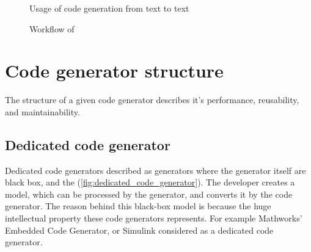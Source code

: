 \begin{figure}
	\centering
	\caption{Usage of code generation from text to text}
\label{fig:model_transformations}
\end{figure}

\begin{figure}
	\centering
	\caption{Workflow of}
\label{fig:model_transformation_cpp}
\end{figure}

\section{Code generator structure}

The structure of a given code generator describes it's performance, reusability, and maintainability.

\subsection{Dedicated code generator}
\label{subsec:dedicated_code_generator}

Dedicated code generators described as generators where the generator itself are black box, and the (\cref{fig:dedicated_code_generator}). The developer creates a model, which can be processed by the generator, and converts it by the code generator. The reason behind this black-box model is because the huge intellectual property these code generators represents. For example Mathworks' Embedded Code Generator, or Simulink \citep{MATHWORKS_ECG}\citep{MATHWORKS_SIMULINK} considered as a dedicated code generator.

